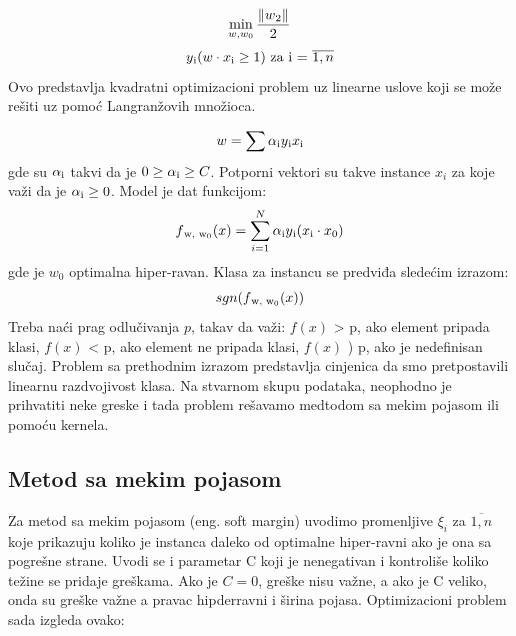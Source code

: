 \documentclass[12pt,oneside]{memoir}
\begin{document}
\begin{equation}
	\min_{w,w_0} \frac{\|w\textsubscript{2}\|}{2} \\
\end{equation}
\begin{equation}
	y\textsubscript{i}(w \cdot x\textsubscript{i} \geq 1) \text{ za i = } \overline{1,n}
\end{equation}
\noindent
Ovo predstavlja kvadratni optimizacioni problem uz linearne uslove koji se može rešiti uz pomoć Langranžovih množioca. 

\begin{equation}
	w = \sum \alpha\textsubscript{i}y\textsubscript{i}x\textsubscript{i}
\end{equation}
\noindent
gde su $\alpha\textsubscript{i}$ takvi da je $0 \geq \alpha\textsubscript{i} \geq C$. Potporni vektori su takve instance $x_i$ za koje važi da je $\alpha\textsubscript{i} \geq 0$. 
\noindent
Model je dat funkcijom:
\begin{equation}
	f\textsubscript{w, w\textsubscript{0}}(x) = \sum_{i=1}^{N} \alpha\textsubscript{i}y\textsubscript{i}(x\textsubscript{i} \cdot x\textsubscript{0})
\end{equation}
\noindent
gde je $w_0$ optimalna hiper-ravan.  Klasa za instancu se predviđa sledećim izrazom:
\begin{equation}
	sgn(f\textsubscript{w, w\textsubscript{0}}(x))
\end{equation}
\noindent
Treba naći prag odlučivanja $p$, takav da važi:
$f(x) $ > p, ako element pripada klasi, 
$f(x) $ < p, ako element ne pripada klasi, 
$f(x) $ ) p,  ako je nedefinisan slučaj. 
\noindent
Problem sa prethodnim izrazom predstavlja cinjenica da smo pretpostavili linearnu razdvojivost klasa.  Na stvarnom skupu podataka, neophodno je prihvatiti neke greske i tada problem rešavamo medtodom sa mekim pojasom ili pomoću kernela.

\subsection{Metod sa mekim pojasom}
Za metod sa mekim pojasom (eng. soft margin) uvodimo promenljive $\xi_i$ za $\overline{1,n}$ koje prikazuju koliko je instanca daleko od optimalne hiper-ravni ako je ona sa pogrešne strane.  Uvodi se i parametar C koji je nenegativan i kontroliše koliko težine se pridaje greškama. Ako je $C=0$, greške nisu važne,  a ako je C veliko, onda su greške važne a pravac hipderravni i širina pojasa.  Optimizacioni problem sada izgleda ovako:
\end{document}
